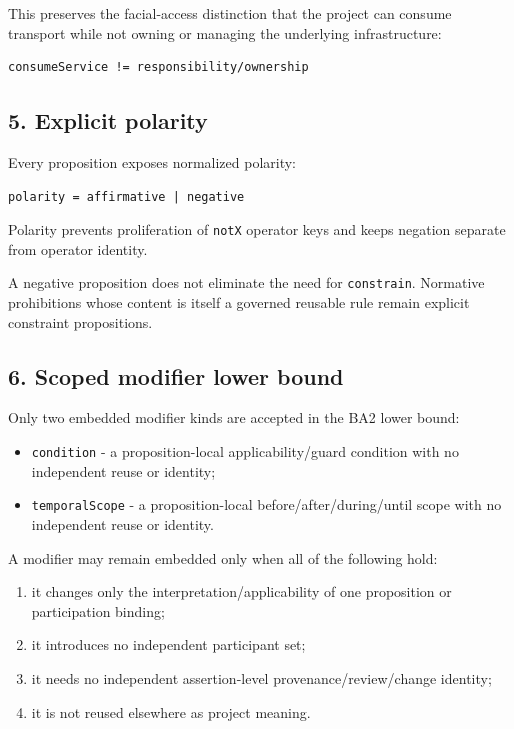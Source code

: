 \documentclass[11pt,a4paper]{article}
\providecommand{\tightlist}{\setlength{\itemsep}{0pt}\setlength{\parskip}{0pt}}
\begin{document}
This preserves the facial-access distinction that the project can consume transport while not owning or managing the underlying infrastructure:

\begin{verbatim}
consumeService != responsibility/ownership
\end{verbatim}

\subsection{5. Explicit polarity}\label{explicit-polarity}

Every proposition exposes normalized polarity:

\begin{verbatim}
polarity = affirmative | negative
\end{verbatim}

Polarity prevents proliferation of \texttt{notX} operator keys and keeps negation separate from operator identity.

A negative proposition does not eliminate the need for \texttt{constrain}. Normative prohibitions whose content is itself a governed reusable rule remain explicit constraint propositions.

\subsection{6. Scoped modifier lower bound}\label{scoped-modifier-lower-bound}

Only two embedded modifier kinds are accepted in the BA2 lower bound:

\begin{itemize}
\tightlist
\item
  \texttt{condition} - a proposition-local applicability/guard condition with no independent reuse or identity;
\item
  \texttt{temporalScope} - a proposition-local before/after/during/until scope with no independent reuse or identity.
\end{itemize}

A modifier may remain embedded only when all of the following hold:

\begin{enumerate}
\def\labelenumi{\arabic{enumi}.}
\tightlist
\item
  it changes only the interpretation/applicability of one proposition or participation binding;
\item
  it introduces no independent participant set;
\item
  it needs no independent assertion-level provenance/review/change identity;
\item
  it is not reused elsewhere as project meaning.
\end{enumerate}
\end{document}
